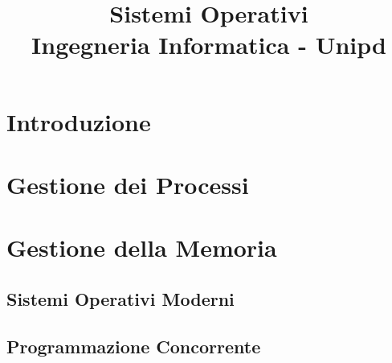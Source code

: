 \documentclass[a4paper,10pt]{report}
\title{\Huge \textbf{Sistemi Operativi}\\ \large Ingegneria Informatica - Unipd}
\date{}
\author{}
\begin{document}
\maketitle

\tableofcontents

\cleardoublepage

\pagestyle{plain} %
\setcounter{page}{1}

\part{Introduzione}





\part{Gestione dei Processi}




\part{Gestione della Memoria}





\appendix
\chapter{Sistemi Operativi Moderni}


\chapter{Programmazione Concorrente}

\end{document}
